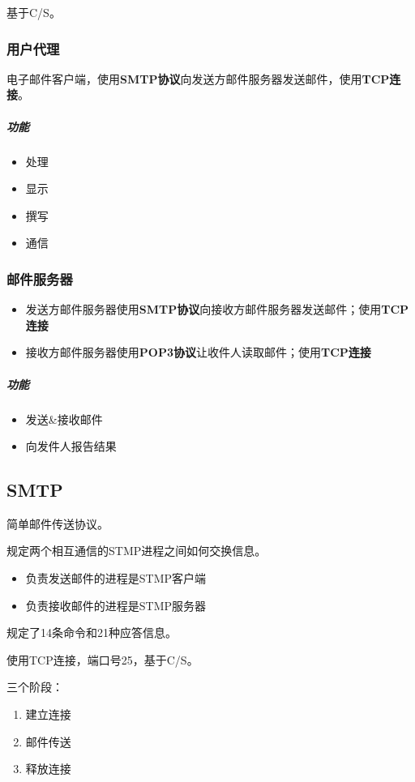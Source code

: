 基于C/S。

\subsubsection{用户代理}
电子邮件客户端，使用\textbf{SMTP协议}向发送方邮件服务器发送邮件，使用\textbf{TCP连接}。

\subparagraph{功能}
\begin{itemize}
    \item 处理
    \item 显示
    \item 撰写
    \item 通信
\end{itemize}

\subsubsection{邮件服务器}

\begin{itemize}
    \item 发送方邮件服务器使用\textbf{SMTP协议}向接收方邮件服务器发送邮件；使用\textbf{TCP连接}
    \item 接收方邮件服务器使用\textbf{POP3协议}让收件人读取邮件；使用\textbf{TCP连接}
\end{itemize}


\subparagraph{功能}
\begin{itemize}
    \item 发送\&接收邮件
    \item 向发件人报告结果
\end{itemize}


\subsection{SMTP}
简单邮件传送协议。

规定两个相互通信的STMP进程之间如何交换信息。
\begin{itemize}
    \item 负责发送邮件的进程是STMP客户端
    \item 负责接收邮件的进程是STMP服务器
\end{itemize}

规定了14条命令和21种应答信息。

使用TCP连接，端口号25，基于C/S。

三个阶段：\begin{enumerate}
    \item 建立连接
    \item 邮件传送
    \item 释放连接
\end{enumerate}

